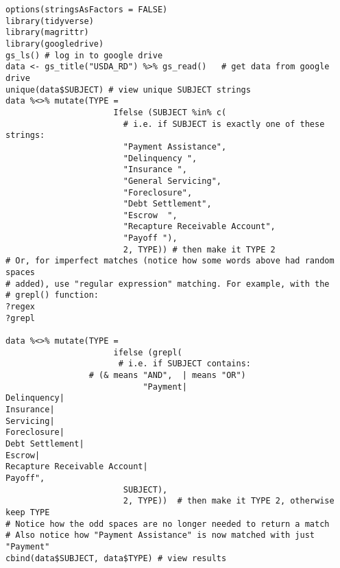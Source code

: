 \documentclass[12pt]{article}
\begin{document}
\hfill\begin{minipage}{\dimexpr\textwidth-2cm}
\begin{verbatim}
options(stringsAsFactors = FALSE)
library(tidyverse)
library(magrittr)
library(googledrive)
gs_ls() # log in to google drive
data <- gs_title("USDA_RD") %>% gs_read()   # get data from google drive
unique(data$SUBJECT) # view unique SUBJECT strings
data %<>% mutate(TYPE =
                      Ifelse (SUBJECT %in% c(
                        # i.e. if SUBJECT is exactly one of these strings:
                        "Payment Assistance",
                        "Delinquency ",
                        "Insurance ", 
                        "General Servicing",
                        "Foreclosure",
                        "Debt Settlement",
                        "Escrow  ",
                        "Recapture Receivable Account",
                        "Payoff "), 
                        2, TYPE)) # then make it TYPE 2
# Or, for imperfect matches (notice how some words above had random spaces 
# added), use "regular expression" matching. For example, with the 
# grepl() function:
?regex
?grepl
                    
data %<>% mutate(TYPE =
                      ifelse (grepl(
                       # i.e. if SUBJECT contains:
				 # (& means "AND",  | means "OR")
                        	"Payment|
Delinquency|
Insurance|
Servicing|
Foreclosure|
Debt Settlement|
Escrow|
Recapture Receivable Account|
Payoff", 
                        SUBJECT), 
                        2, TYPE))  # then make it TYPE 2, otherwise keep TYPE
# Notice how the odd spaces are no longer needed to return a match
# Also notice how "Payment Assistance" is now matched with just "Payment"
cbind(data$SUBJECT, data$TYPE) # view results
\end{verbatim}
\end{minipage}
\end{document}
